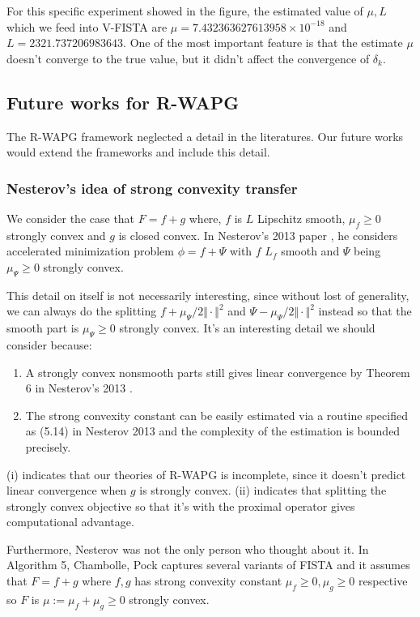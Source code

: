 \documentclass[12pt]{article}
\begin{document}
            For this specific experiment showed in the figure, the estimated value of $\mu, L$ which we feed into V-FISTA are $\mu = 7.432363627613958\times 10^{-18}$ and $L = 2321.737206983643$. 
            One of the most important feature is that the estimate $\mu$ doesn't converge to the true value, but it didn't affect the convergence of $\delta_k$. 

    
    \subsection{Future works for R-WAPG}
        The R-WAPG framework neglected a detail in the literatures. 
        Our future works would extend the frameworks and include this detail. 
        \subsubsection{Nesterov's idea of strong convexity transfer}
            We consider the case that $F = f + g$ where, $f$ is $L$ Lipschitz smooth, $\mu_f \ge 0$ strongly convex and $g$ is closed convex. 
            In Nesterov's 2013 paper \cite{nesterov_gradient_2013}, he considers accelerated  minimization problem $\phi = f + \Psi$ with $f$ $L_f$ smooth and $\Psi$ being $\mu_\Psi \ge 0$ strongly convex. 
            \par
            This detail on itself is not necessarily interesting, since without lost of generality, we can always do the splitting $f + \mu_\Psi/2 \Vert \cdot\Vert^2$ and $\Psi - \mu_\Psi/2\Vert \cdot\Vert^2$ instead so that the smooth part is $\mu_\Psi \ge 0$ strongly convex. 
            It's an interesting detail we should consider because: 
            \begin{enumerate}
                \item A strongly convex nonsmooth parts still gives linear convergence by Theorem 6 in Nesterov's 2013 \cite{nesterov_gradient_2013}. 
                \item The strong convexity constant can be easily estimated via a routine specified as (5.14) in Nesterov 2013 \cite{nesterov_gradient_2013} and the complexity of the estimation is bounded precisely. 
            \end{enumerate}
            (i) indicates that our theories of R-WAPG is incomplete, since it doesn't predict linear convergence when $g$ is strongly convex. 
            (ii) indicates that splitting the strongly convex objective so that it's with the proximal operator gives computational advantage. 
            \par
            Furthermore, Nesterov was not the only person who thought about it.
            In 
            Algorithm 5, Chambolle, Pock \cite{chambolle_introduction_2016} captures several variants of FISTA and it assumes that $F = f + g$ where $f, g$ has strong convexity constant $\mu_f \ge 0, \mu_g \ge 0$ respective so $F$ is $\mu := \mu_f + \mu_g \ge 0$ strongly convex. 
            
\end{document}
